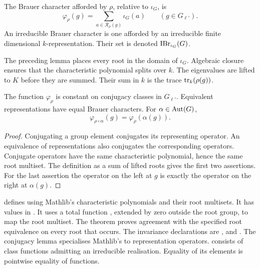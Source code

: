 \begin{definition}
\label{lib:brauer:character-definition}
The Brauer character afforded by $\rho$, relative to $\iota_G$, is
\[
 \varphi_\rho(g)=\sum_{a\in\mathcal R_\rho(g)}\iota_G(a)
 \qquad(g\in G_{\ell'}).
\]
An irreducible Brauer character is one afforded by an irreducible finite
dimensional $k$-representation. Their set is denoted
$\operatorname{IBr}_{\iota_G}(G)$.
\end{definition}

The preceding lemma places every root in the domain of $\iota_G$.
Algebraic closure ensures that the characteristic polynomial splits over
$k$. The eigenvalues are lifted to $K$ before they are summed.
Their sum in $k$ is the trace $\operatorname{tr}_k(\rho(g))$.

\begin{proposition}
\label{lib:brauer:invariance}
The function $\varphi_\rho$ is constant on conjugacy classes in
$G_{\ell'}$. Equivalent representations have equal Brauer characters.
For $\alpha\in\operatorname{Aut}(G)$,
\[
 \varphi_{\rho\circ\alpha}(g)=\varphi_\rho(\alpha(g)).
\]
\end{proposition}
\begin{proof}
Conjugating a group element conjugates its representing operator.
An equivalence of representations also conjugates the corresponding
operators. Conjugate operators have the same characteristic polynomial,
hence the same root multiset. The definition as a sum of lifted roots gives the first two
assertions. For the last assertion the operator on the left at $g$ is
exactly the operator on the right at $\alpha(g)$.
\end{proof}

\begin{implementation}
 defines
 using Mathlib's
characteristic polynomials and their root multisets. It has values in
. It uses a total function
, extended by zero outside the root
group, to map the root multiset. The theorem
 proves agreement with
the specified root equivalence on every root that occurs.
The invariance declarations are
,
 and
.
The conjugacy lemma specialises Mathlib's
 to representation operators.
 consists of class functions admitting an
irreducible  realisation. Equality of its elements is
pointwise equality of functions.
\end{implementation}

